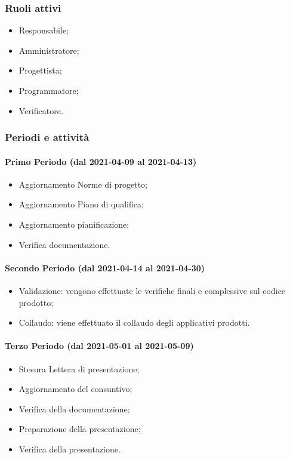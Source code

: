\subsubsection{Ruoli attivi}
\begin{itemize}
	\item Responsabile;
	\item Amministratore;
	\item Progettista;
	\item Programmatore;
		\item Verificatore.
\end{itemize}

\subsubsection{Periodi e attività}

\paragraph{Primo Periodo (dal 2021-04-09 al 2021-04-13)}
\begin{itemize}
	\item Aggiornamento Norme di progetto;
	\item Aggiornamento Piano di qualifica;
	\item Aggiornamento pianificazione;
	\item Verifica documentazione.
\end{itemize}

\paragraph{Secondo Periodo (dal 2021-04-14 al 2021-04-30)}
\begin{itemize}
	\item Validazione: vengono effettuate le verifiche finali e complessive sul codice prodotto;
	\item Collaudo: viene effettuato il collaudo degli applicativi prodotti.
\end{itemize}

\paragraph{Terzo Periodo (dal 2021-05-01 al 2021-05-09)}
\begin{itemize}
	\item Stesura Lettera di presentazione;
	\item Aggiornamento del consuntivo;
	\item Verifica della documentazione;
	\item Preparazione della presentazione;
	\item Verifica della presentazione.
\end{itemize}

